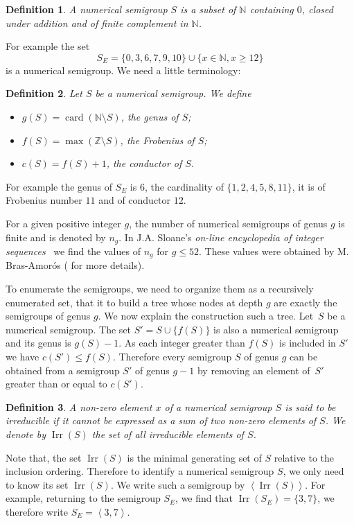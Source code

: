 \documentclass{deliverablereport}
\newcommand{\NN}{\mathbb{N}}
\DeclareMathOperator{\Irr}{Irr}
\newtheorem{defi}{Definition}
\begin{document}
\begin{defi}
  A \emph{numerical semigroup} $S$ is a subset of $\NN$ containing $0$, closed
  under addition and of finite complement in $\NN$.
\end{defi}
For example the set
\begin{equation}
\label{E:NSG}
S_E=\{0,3,6,7,9,10\}\cup\{x\in\NN, x\geq 12\}
\end{equation}
is a numerical semigroup. We need a little terminology:
\begin{defi}
Let $S$ be a numerical semigroup. We define
\begin{itemize}
\item $g(S)=\operatorname{card}(\NN\setminus S)$, the \emph{genus} of $S$;
\item $f(S)=\max(\mathbb{Z}\setminus S)$, the \emph{Frobenius} of $S$;
\item $c(S)=f(S)+1$, the \emph{conductor of $S$}.
\end{itemize}
\end{defi}
For example the genus of $S_E$ is $6$, the cardinality of $\{1,2,4,5,8,11\}$,
it is of Frobenius number $11$ and of conductor $12$.

For a given positive integer $g$, the number of numerical semigroups of genus
$g$ is finite and is denoted by $n_g$.  In J.A. Sloane's \emph{on-line
  encyclopedia of integer sequences}~\cite{OEIS} we find the values of $n_g$
for $g\leq 52$.  These values were obtained by M. Bras-Amor\'os
(\cite{BrasAmoros2008} for more details).  \bigskip

To enumerate the semigroups, we need to organize them as a recursively
enumerated set, that it to build a tree whose nodes at depth $g$ are exactly
the semigroups of genus $g$.  We now explain the construction such a tree.
Let~$S$ be a numerical semigroup. The set $S'=S\cup\{f(S)\}$ is also a
numerical semigroup and its genus is $g(S)-1$.  As each integer greater than
$f(S)$ is included in $S'$ we have $c(S')\leq f(S)$.  Therefore every
semigroup $S$ of genus $g$ can be obtained from a semigroup $S'$ of genus
$g-1$ by removing an element of~$S'$ greater than or equal to $c(S')$.

\begin{defi}
  A non-zero element $x$ of a numerical semigroup $S$ is said to be
  \emph{irreducible} if it cannot be expressed as a sum of two non-zero
  elements of $S$.  We denote by $\Irr(S)$ the set of all irreducible elements
  of $S$.
\end{defi}
Note that, the set $\Irr(S)$ is the minimal generating set of $S$ relative
to the inclusion ordering. Therefore to identify a numerical semigroup $S$, we
only need to know its set $\Irr(S)$. We write such a semigroup by
$\left<\Irr(S)\right>$. For example, returning to the semigroup $S_E$, we find
that $\Irr(S_E) = \{3, 7\}$, we therefore write $S_E=\left<3,7\right>$.
\end{document}
